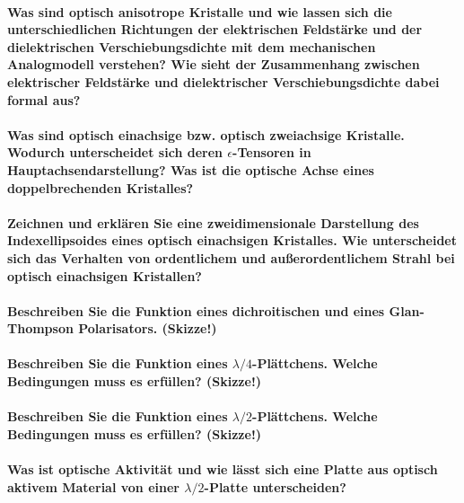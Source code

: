\documentclass[a4paper, 11pt, parskip=half]{scrartcl}
\begin{document}
\paragraph{Was sind optisch anisotrope Kristalle und wie lassen sich die unterschiedlichen
Richtungen der elektrischen Feldstärke und der dielektrischen Verschiebungsdichte mit dem
mechanischen Analogmodell verstehen? Wie sieht der Zusammenhang zwischen elektrischer Feldstärke und dielektrischer Verschiebungsdichte dabei formal aus?}

\paragraph{Was sind optisch einachsige bzw. optisch zweiachsige Kristalle. Wodurch unterscheidet
sich deren $\epsilon$-Tensoren in Hauptachsendarstellung? Was ist die optische Achse eines
doppelbrechenden Kristalles?}

\paragraph{Zeichnen und erklären Sie eine zweidimensionale Darstellung des Indexellipsoides eines
optisch einachsigen Kristalles. Wie unterscheidet sich das Verhalten von ordentlichem und
außerordentlichem Strahl bei optisch einachsigen Kristallen?}

\paragraph{Beschreiben Sie die Funktion eines dichroitischen und eines Glan-Thompson Polarisators.
(Skizze!)}

\paragraph{Beschreiben Sie die Funktion eines $\lambda/4$-Plättchens. Welche Bedingungen muss es
erfüllen? (Skizze!)}

\paragraph{Beschreiben Sie die Funktion eines $\lambda/2$-Plättchens. Welche Bedingungen muss es
erfüllen? (Skizze!)}

\paragraph{Was ist optische Aktivität und wie lässt sich eine Platte aus optisch aktivem Material
von einer $\lambda/2$-Platte unterscheiden?}
\end{document}
